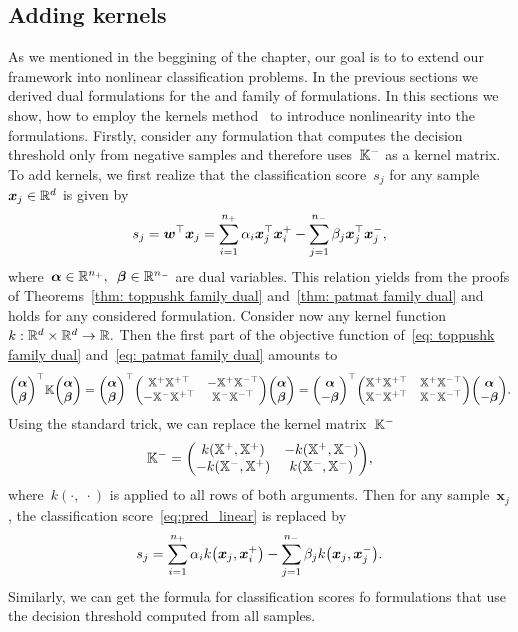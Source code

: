 \subsection{Adding kernels}

As we mentioned in the beggining of the chapter, our goal is to to extend our framework into nonlinear classification problems. In the previous sections we derived dual formulations for the \TopPushK and \PatMat family of formulations. In this sections we show, how to employ the kernels method~\cite{scholkopf2001learning} to introduce nonlinearity into the formulations. Firstly, consider any formulation that computes the decision threshold only from negative samples and therefore uses~$\mathbb{K}^{-}$ as a kernel matrix. To add kernels, we first realize that the classification score~$s_j$ for any sample~$\bm{x}_j \in \mathbb{R}^d$ is given by 
\begin{equation}\label{eq:pred_linear}
  s_j
    = \bm{w}^{\top} \bm{x}_j
    = \sum_{i = 1}^{n_{+}} \alpha_i \bm{x}_j^{\top} \bm{x}_i^+ - \sum_{j = 1}^{n_{-}} \beta_j \bm{x}_j^{\top} \bm{x}_j^-,
\end{equation}
where~$\bm{\alpha} \in \mathbb{R}^{n_{+}},$~$\bm{\beta} \in \mathbb{R}^{n_{-}}$ are dual variables. This relation yields from the proofs of Theorems~\ref{thm: toppushk family dual} and~\ref{thm: patmat family dual} and holds for any considered formulation. Consider now any kernel function~$k: \mathbb{R}^d \times \mathbb{R}^d \to \mathbb{R}.$ Then the first part of the objective function of~\eqref{eq: toppushk family dual} and~\eqref{eq: patmat family dual} amounts to
\begin{equation*}
  \vecab^\top \K \vecab
  = \vecab^\top \Matrix{\X^+ \X^{+\top} & -\X^+ \X^{-\top} \\ -\X^- \X^{+\top} & \X^- \X^{-\top} } \vecab
  = \Matrix{\bm{\alpha} \\ -\bm{\beta}}^\top \Matrix{\X^+ \X^{+\top} & \X^+ \X^{-\top} \\ \X^- \X^{+\top} & \X^- \X^{-\top} }\Matrix{\bm{\alpha} \\ -\bm{\beta}}.
\end{equation*}
Using the standard trick, we can replace the kernel matrix~$\mathbb{K}^{-}$
\begin{equation}\label{eq:kernel_nonlinear}
  \Kneg = \Matrix{k(\X^+, \X^{+}) & -k(\X^+, \X^{-}) \\ -k(\X^-, \X^{+}) & k(\X^-, \X^{-}) },
\end{equation}
where~$k(\cdot,\; \cdot)$ is applied to all rows of both arguments. Then for any sample~$\bm{x}_j$, the classification score~\eqref{eq:pred_linear} is replaced by
\begin{equation*}
  s_j = \sum_{i = 1}^{\npos} \alpha_i k\Brac{\bm{x}_j, \bm{x}^+_i} - \sum_{j = 1}^{\nneg} \beta_j k\Brac{\bm{x}_j, \bm{x}^-_j}.
\end{equation*}
Similarly, we can get the formula for classification scores fo formulations that use the decision threshold computed from all samples. 

